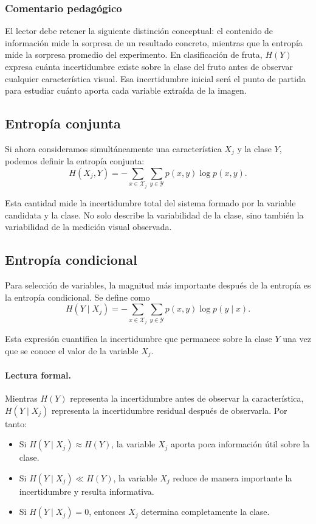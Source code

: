 \documentclass{article}
\begin{document}
\subsubsection*{Comentario pedagógico}

El lector debe retener la siguiente distinción conceptual: el contenido de información mide la sorpresa de un resultado concreto, mientras que la entropía mide la sorpresa promedio del experimento. En clasificación de fruta, \(H(Y)\) expresa cuánta incertidumbre existe sobre la clase del fruto antes de observar cualquier característica visual. Esa incertidumbre inicial será el punto de partida para estudiar cuánto aporta cada variable extraída de la imagen.
\subsection{Entropía conjunta}

Si ahora consideramos simultáneamente una característica \(X_j\) y la clase \(Y\), podemos definir la entropía conjunta:
\[
H(X_j,Y) = -\sum_{x\in\mathcal{X}_j}\sum_{y\in\mathcal{Y}} p(x,y)\log p(x,y).
\]

Esta cantidad mide la incertidumbre total del sistema formado por la variable candidata y la clase. No solo describe la variabilidad de la clase, sino también la variabilidad de la medición visual observada.

\subsection{Entropía condicional}

Para selección de variables, la magnitud más importante después de la entropía es la entropía condicional. Se define como
\[
H(Y\mid X_j) = -\sum_{x\in\mathcal{X}_j}\sum_{y\in\mathcal{Y}} p(x,y)\log p(y\mid x).
\]

Esta expresión cuantifica la incertidumbre que permanece sobre la clase \(Y\) una vez que se conoce el valor de la variable \(X_j\).

\paragraph{Lectura formal.}
Mientras \(H(Y)\) representa la incertidumbre antes de observar la característica, \(H(Y\mid X_j)\) representa la incertidumbre residual después de observarla. Por tanto:

\begin{itemize}
\item Si \(H(Y\mid X_j)\approx H(Y)\), la variable \(X_j\) aporta poca información útil sobre la clase.
\item Si \(H(Y\mid X_j)\ll H(Y)\), la variable \(X_j\) reduce de manera importante la incertidumbre y resulta informativa.
\item Si \(H(Y\mid X_j)=0\), entonces \(X_j\) determina completamente la clase.
\end{itemize}
\end{document}
